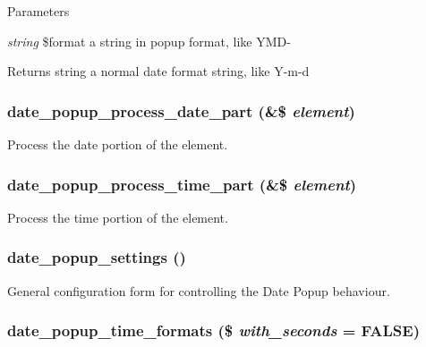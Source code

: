 \begin{DoxyParams}{Parameters}
\item[{\em string}]\$format a string in popup format, like YMD-\/ \end{DoxyParams}
\begin{DoxyReturn}{Returns}
string a normal date format string, like Y-\/m-\/d 
\end{DoxyReturn}
\hypertarget{date__popup_8module_a63e8f88e1024d1a70aaa2a2947dded90}{
\subsubsection[{date\_\-popup\_\-process\_\-date\_\-part}]{\setlength{\rightskip}{0pt plus 5cm}date\_\-popup\_\-process\_\-date\_\-part (\&\$ {\em element})}}
\label{date__popup_8module_a63e8f88e1024d1a70aaa2a2947dded90}
Process the date portion of the element. \hypertarget{date__popup_8module_a53fb75e9ce4c99c392db6eac983ab105}{
\subsubsection[{date\_\-popup\_\-process\_\-time\_\-part}]{\setlength{\rightskip}{0pt plus 5cm}date\_\-popup\_\-process\_\-time\_\-part (\&\$ {\em element})}}
\label{date__popup_8module_a53fb75e9ce4c99c392db6eac983ab105}
Process the time portion of the element. \hypertarget{date__popup_8module_a29fa4cb6dcb228f28268ff94ab3ec2be}{
\subsubsection[{date\_\-popup\_\-settings}]{\setlength{\rightskip}{0pt plus 5cm}date\_\-popup\_\-settings ()}}
\label{date__popup_8module_a29fa4cb6dcb228f28268ff94ab3ec2be}
General configuration form for controlling the Date Popup behaviour. \hypertarget{date__popup_8module_ac8083952de3412b9fb7ded7bb98b47e2}{
\subsubsection[{date\_\-popup\_\-time\_\-formats}]{\setlength{\rightskip}{0pt plus 5cm}date\_\-popup\_\-time\_\-formats (\$ {\em with\_\-seconds} = {\ttfamily FALSE})}}

